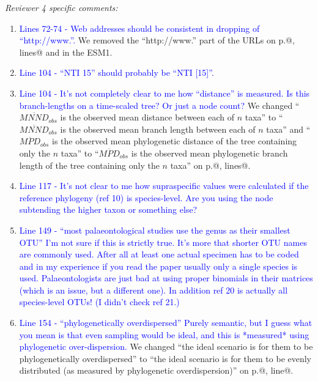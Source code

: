 \documentclass[12pt,letterpaper]{article}
\renewcommand{\subsection}[1]{%
\bigskip
\begin{center}
\begin{large}
\normalfont\itshape #1
\end{large}
\end{center}}
\begin{document}
\subsection{Reviewer 4 specific comments:}
\begin{enumerate}
\item{\textcolor{blue}{Lines 72-74 - Web addresses should be consistent in dropping of ``http://www.''.}}
We removed the ``http://www.'' part of the URLs on p.@, lines@ and in the ESM1.

\item{\textcolor{blue}{Line 104 - ``NTI 15'' should probably be ``NTI [15]''.}}

\item{\textcolor{blue}{Line 104 - It’s not completely clear to me how ``distance'' is measured. Is this branch-lengths on a time-scaled tree? Or just a node count?}}
We changed ``$\overline{MNND}_{obs}$ is the observed mean distance between each of $n$ taxa'' to ``$\overline{MNND}_{obs}$ is the observed mean branch length between each of $n$ taxa'' and ``$\overline{MPD}_{obs}$ is the observed mean phylogenetic distance of the tree containing only the $n$ taxa'' to ``$\overline{MPD}_{obs}$ is the observed mean phylogenetic branch length of the tree containing only the $n$ taxa'' on p.@, lines@.

\item{\textcolor{blue}{Line 117 - It’s not clear to me how supraspecific values were calculated if the reference phylogeny (ref 10) is species-level. Are you using the node subtending the higher taxon or something else?}}

\item{\textcolor{blue}{Line 149 - ``most palaeontological studies use the genus as their smallest OTU'' I’m not sure if this is strictly true. It’s more that shorter OTU names are commonly used. After all at least one actual specimen has to be coded and in my experience if you read the paper usually only a single species is used. Palaeontologists are just bad at using proper binomials in their matrices (which is an issue, but a different one). In addition ref 20 is actually all species-level OTUs! (I didn’t check ref 21.)}}

\item{\textcolor{blue}{Line 154 - ``phylogenetically overdispersed'' Purely semantic, but I guess what you mean is that even sampling would be ideal, and this is *measured* using phylogenetic over-dispersion.}}
We changed ``the ideal scenario is for them to be phylogenetically overdispersed'' to ``the ideal scenario is for them to be evenly distributed (as measured by phylogenetic overdispersion)'' on p.@, line@.


\end{enumerate}
\end{document}
